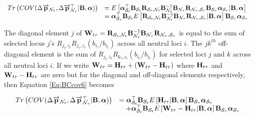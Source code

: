 \documentclass[12pt]{article}
\begin{document}
\begin{bibunit}
\begin{footnotesize}
\begin{equation}
\begin{array}{rl}
Tr\left(COV(\Delta \overrightarrow{\bf p}_{{\mathcal N}_t}, \Delta \overrightarrow{\bf p}_{{\mathcal N}_{\tau}}^\top  | {\bf B}, \boldsymbol{\alpha})\right)&=
E\left[\boldsymbol{\alpha}_{{\mathcal S}_{t}}^{\top}{\bf B}_{{\mathcal S}_t}{\bf R}_{{\mathcal S}_t, {\mathcal N}_t}{\bf B}_{{\mathcal N}_t}^{-1}{\bf B}_{{\mathcal N}_{\tau}}{\bf R}_{{\mathcal N}_\tau, {\mathcal S}_{\tau}}{\bf B}_{{\mathcal S}_{\tau}}\boldsymbol{\alpha}_{{\mathcal S}_{\tau}} | {\bf B}, \boldsymbol{\alpha}\right]\\
&=
\boldsymbol{\alpha}_{{\mathcal S}_{\tau}}^{\top}{\bf B}_{{\mathcal S}_t}E\left[{\bf R}_{{\mathcal S}_t, {\mathcal N}_t}{\bf B}_{{\mathcal N}_t}^{-1}{\bf B}_{{\mathcal N}_{\tau}}{\bf R}_{{\mathcal N}_\tau, {\mathcal S}_{\tau}} | {\bf B}, \boldsymbol{\alpha}\right]{\bf B}_{{\mathcal S}_{\tau}}\boldsymbol{\alpha}_{{\mathcal S}_{\tau}}\\
\end{array}
\label{Eq:BCcov6}
\end{equation}
\end{footnotesize}

The diagonal element $j$ of ${\bf W}_{t\tau}={\bf R}_{{\mathcal S}_t, {\mathcal N}_t}{\bf B}_{{\mathcal N}_t}^{-1}{\bf B}_{{\mathcal N}_{\tau}}{\bf R}_{{\mathcal N}_\tau, {\mathcal S}_{\tau}}$ is equal to the sum of selected locus $j$'s $R_{j_t,i_t}R_{j_{\tau},i_{\tau}}(b_{i_\tau}/b_{i_t})$ across all neutral loci $i$. The $jk^{th}$ off-diagonal element is the sum of $R_{j_t,i_t}R_{k_{\tau},i_{\tau}}(b_{i_\tau}/b_{i_t})$ for selected loci $j$ and $k$ across all neutral loci $i$. If we write  ${\bf W}_{t\tau} = {\bf H}_{t\tau}+({\bf W}_{t\tau}-{\bf H}_{t\tau})$ where ${\bf H}_{t\tau}$ and ${\bf W}_{t\tau}-{\bf H}_{t\tau}$ are zero but for the diagonal and off-diagonal elements respectively, then Equation \ref{Eq:BCcov6} becomes


\begin{equation}
\begin{array}{rl}
Tr\left(COV(\Delta \overrightarrow{\bf p}_{{\mathcal N}_t}, \Delta \overrightarrow{\bf p}_{{\mathcal N}_{\tau}}^\top | {\bf B}, \boldsymbol{\alpha})\right)&=
\boldsymbol{\alpha}_{{\mathcal S}_t}^{\top}{\bf B}_{{\mathcal S}_t}E\left[{\bf H}_{t\tau} | {\bf B}, \boldsymbol{\alpha}\right]{\bf B}_{{\mathcal S}_{\tau}}\boldsymbol{\alpha}_{{\mathcal S}_{\tau}}\\
&\quad+\boldsymbol{\alpha}_{{\mathcal S}_{t}}^{\top}{\bf B}_{{\mathcal S}_t}E\left[{\bf W}_{t\tau}-{\bf H}_{t\tau} | {\bf B}, \boldsymbol{\alpha}\right]{\bf B}_{{\mathcal S}_{\tau}}\boldsymbol{\alpha}_{{\mathcal S}_{\tau}}\\
\end{array}
\label{Eq:BCcov7}
\end{equation}


\end{bibunit}
\end{document}

